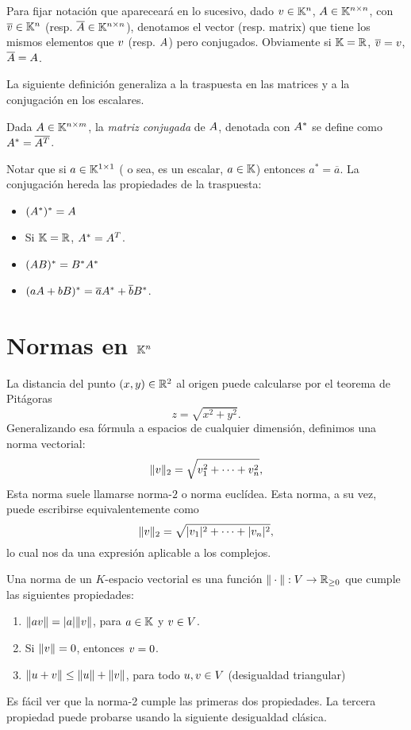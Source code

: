 Para fijar notación que apareceará en lo sucesivo, dado $\vb\in \Kn$, $\Ab\in \Knn$, con $\overline{\vb}\in \Kn$ (resp. $\overline{\Ab}\in \Knn$), denotamos el vector (resp. matrix) que tiene los mismos elementos que $\vb$ (resp. $\Ab$) pero conjugados. Obviamente si $\mathbb K=\mathbb R$, $\overline{\vb}=\vb$,  $\overline{\Ab}=\Ab$.


La siguiente definición generaliza a la traspuesta en las matrices y a la conjugación en los escalares.

\tccdefi
\begin{defi}
 Dada $\Ab\in \K^{n\times m}$, la \emph{matriz conjugada} de $\Ab$, denotada con $\Ab^*$
 se define como $\Ab^*=\overline{\Ab^T}$.
 \end{defi}

\etcc
Notar que si $a\in \mathbb K^{1\times 1}$ ( o sea, es un escalar, $a\in \mathbb K$) entonces $a^*=\overline{a}$. La conjugación hereda las propiedades de la traspuesta:
\begin{itemize}
 \item $(\Ab^*)^*=\Ab$
 \item Si $\mathbb K=\mathbb R$, $\Ab^*=\Ab^T$.
 \item $(\Ab\Bb)^*=\Bb^*\Ab^*$
 \item $(a\Ab+b\Bb)^*=\overline{a}\Ab^*+ \overline{b}\Bb^*$.
\end{itemize}


\section{Normas en $\mathbb K^n$}

La distancia del punto $(x,y)\in \mathbb R^2$  al origen puede calcularse por el teorema de Pitágoras
$$
z = \sqrt{x^2 + y^2}.
$$
Generalizando esa fórmula a espacios de cualquier dimensión, definimos una norma vectorial:
$$
\|\vb\|_2 = \sqrt{v_1^2 + \dots + v_n^2},
$$
Esta norma suele llamarse norma-$2$ o norma euclídea. Esta norma,  a su vez, puede escribirse equivalentemente como
$$
\|\vb\|_2 = \sqrt{|v_1|^2 + \dots + |v_n|^2},
$$
lo cual nos da una expresión aplicable a los complejos.

\tccdefi
\begin{defi}
Una norma de un $K$-espacio vectorial es una función $\| \cdot \| : V \rightarrow \mathbb R_{\ge 0}$ que cumple las siguientes propiedades:
\begin{enumerate}
\item $\|a \vb\| = |a| \|\vb\|$, para $a \in \mathbb K$ y $\vb \in V$.
\item Si $\|\vb\| = 0$, entonces $\vb = 0$.
\item $\|\ub + \vb\| \le \|\ub\| + \|\vb\|$, para todo $\ub, \vb \in V$ \qquad (desigualdad triangular)
\end{enumerate}
\end{defi}
\etcc
Es fácil ver que la norma-2 cumple las primeras dos propiedades.  La tercera propiedad puede probarse usando la siguiente desigualdad clásica.


